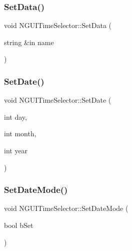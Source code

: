 \hypertarget{class_n_g_u_i_time_selector_a13d82203e586e883da41b00830ef894e}{}\label{class_n_g_u_i_time_selector_a13d82203e586e883da41b00830ef894e} 
\subsubsection{\texorpdfstring{Set\+Data()}{SetData()}}
{\footnotesize\ttfamily void N\+G\+U\+I\+Time\+Selector\+::\+Set\+Data (\begin{DoxyParamCaption}\item[{string \&in}]{name }\end{DoxyParamCaption})}

\hypertarget{class_n_g_u_i_time_selector_a6575cedb24ac12bb0d6ad6ec28938a78}{}\label{class_n_g_u_i_time_selector_a6575cedb24ac12bb0d6ad6ec28938a78} 
\subsubsection{\texorpdfstring{Set\+Date()}{SetDate()}}
{\footnotesize\ttfamily void N\+G\+U\+I\+Time\+Selector\+::\+Set\+Date (\begin{DoxyParamCaption}\item[{int}]{day,  }\item[{int}]{month,  }\item[{int}]{year }\end{DoxyParamCaption})}

\hypertarget{class_n_g_u_i_time_selector_ab59537f034d5e6035354fd1ee1cce785}{}\label{class_n_g_u_i_time_selector_ab59537f034d5e6035354fd1ee1cce785} 
\subsubsection{\texorpdfstring{Set\+Date\+Mode()}{SetDateMode()}}
{\footnotesize\ttfamily void N\+G\+U\+I\+Time\+Selector\+::\+Set\+Date\+Mode (\begin{DoxyParamCaption}\item[{bool}]{b\+Set }\end{DoxyParamCaption})}

